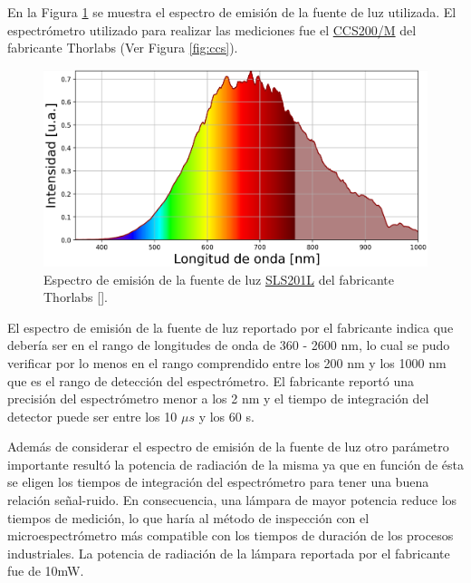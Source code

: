En la Figura \ref{fig:espfth} se muestra el espectro de emisión de la fuente de luz utilizada.  El espectrómetro utilizado para realizar las mediciones fue el \href{https://www.thorlabs.com/thorproduct.cfm?partnumber=CCS200/M#ad-image-0}{CCS200/M} del fabricante Thorlabs (Ver Figura \ref{fig:ccs}).

\begin{figure}[H]
	\centering
	\includegraphics[width=1.0\textwidth]{Figs/microespectrometro/espfuentethorl.png}
	\caption{Espectro de emisión de la fuente de luz \href{https://www.thorlabs.com/newgrouppage9.cfm?objectgroup\_id=7269&pn=SLS201L/M}{SLS201L} del fabricante Thorlabs [\href{https://github.com/jrr1984/defects\_analysis/blob/master/light\_sources\_spectrum.py}{\faGithub}].}
	\label{fig:espfth}
\end{figure}

El espectro de emisión de la fuente de luz reportado por el fabricante indica que debería ser en el rango de longitudes de onda de 360 - 2600 nm, lo cual se pudo verificar por lo menos en el rango comprendido entre los 200 nm y los 1000 nm que es el rango de detección del espectrómetro. El fabricante reportó una precisión del espectrómetro menor a los 2 nm y el tiempo de integración del detector puede ser entre los 10 $\mu s$ y los 60 s.

Además de considerar el espectro de emisión de la fuente de luz otro parámetro importante resultó la potencia de radiación de la misma ya que en función de ésta se eligen los tiempos de integración del espectrómetro para tener una buena relación señal-ruido. En consecuencia, una lámpara de mayor potencia reduce los tiempos de medición, lo que haría al método de inspección con el microespectrómetro más compatible con los tiempos de duración de los procesos industriales. La potencia de radiación de la lámpara reportada por el fabricante fue de 10mW.

